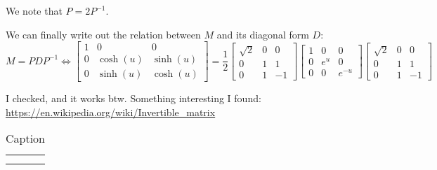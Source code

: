 \documentclass{article}
\begin{document}
We note that $P = 2P^{-1}$.

We can finally write out the relation between $M$ and its diagonal form $D$: 
\begin{equation}
    M = P D P^{-1} \Leftrightarrow \begin{bmatrix} 1 & 0 & 0 \\ 0 & \cosh(u) & \sinh(u) \\ 0 & \sinh(u) & \cosh(u) \end{bmatrix} = \frac{1}{2} \begin{bmatrix} \sqrt{2} & 0 & 0 \\ 0 & 1 & 1 \\ 0 & 1 & -1 \end{bmatrix} \begin{bmatrix} 1 & 0 & 0 \\ 0 & e^u & 0 \\ 0 & 0 & e^{-u} \end{bmatrix} \begin{bmatrix} \sqrt{2} & 0 & 0 \\ 0 & 1 & 1 \\ 0 & 1 & -1 \end{bmatrix}
\end{equation}

I checked, and it works btw. Something interesting I found: \href{https://www.youtube.com/watch?v=a3Z7zEc7AXQ}{https://en.wikipedia.org/wiki/Invertible\_matrix}

    \label{tab:my_label}
\begin{table}
    \centering
    \begin{tabular}{c|c}
         &  \\
         & 
    \end{tabular}
    \caption{Caption}
\end{table}
\end{document}
